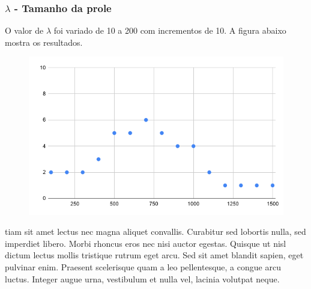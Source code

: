 \documentclass{article}
\begin{document}
\subsubsection{$\lambda$ - Tamanho da prole}
\quad O valor de $\lambda$ foi variado de 10 a 200 com incrementos de 10. A figura abaixo mostra os resultados.
\begin{figure}[H]
\centering
\includegraphics[scale=0.35]{placeholder}
\end{figure}
\quad tiam sit amet lectus nec magna aliquet convallis. Curabitur sed lobortis nulla, sed imperdiet libero. Morbi rhoncus eros nec nisi auctor egestas. Quisque ut nisl dictum lectus mollis tristique rutrum eget arcu. Sed sit amet blandit sapien, eget pulvinar enim. Praesent scelerisque quam a leo pellentesque, a congue arcu luctus. Integer augue urna, vestibulum et nulla vel, lacinia volutpat neque.
\end{document}
